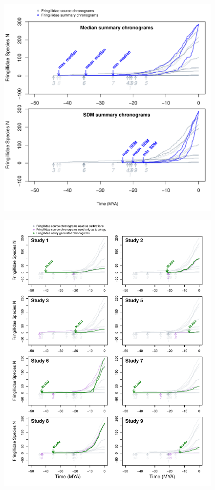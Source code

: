 \documentclass[]{article}
\begin{document}
\newpage

\begin{figure}[!h]
\includegraphics{fig_summaries.pdf}
\caption{}
\label{fig:summaries}
\end{figure}

\newpage

\begin{figure}[!h]
\includegraphics{fig_crossval_bladj.pdf}
\caption{}
\label{fig:cvbladj}
\end{figure}
\end{document}
